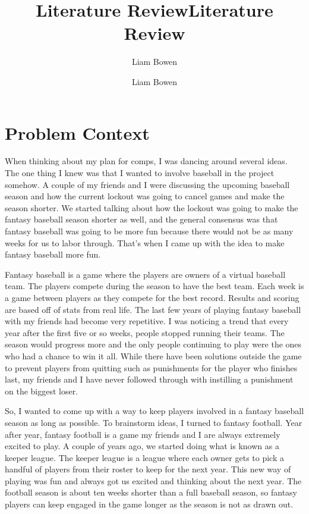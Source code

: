 \documentclass[10pt,twocolumn]{article}
\title{Literature Review}
\author{Liam Bowen}
\begin{document}
\title{Literature Review}
\author{Liam Bowen}

\maketitle

\section{Problem Context}
	
When thinking about my plan for comps, I was dancing around several ideas. The one thing I knew was that I wanted to involve baseball in the project somehow. A couple of my friends and I were discussing the upcoming baseball season and how the current lockout was going to cancel games and make the season shorter. We started talking about how the lockout was going to make the fantasy baseball season shorter as well, and the general consensus was that fantasy baseball was going to be more fun because there would not be as many weeks for us to labor through. That’s when I came up with the idea to make fantasy baseball more fun. 	
		
Fantasy baseball is a game where the players are owners of a virtual baseball team. The players compete during the season to have the best team. Each week is a game between players as they compete for the best record. Results and scoring are based off of stats from real life. The last few years of playing fantasy baseball with my friends had become very repetitive. I was noticing a trend that every year after the first five or so weeks, people stopped running their teams. The season would progress more and the only people continuing to play were the ones who had a chance to win it all. While there have been solutions outside the game to prevent players from quitting such as punishments for the player who finishes last, my friends and I have never followed through with instilling a punishment on the biggest loser. 

So, I wanted to come up with a way to keep players involved in a fantasy baseball season as long as possible. To brainstorm ideas, I turned to fantasy football. Year after year, fantasy football is a game my friends and I are always extremely excited to play. A couple of years ago, we started doing what is known as a keeper league. The keeper league is a league where each owner gets to pick a handful of players from their roster to keep for the next year. This new way of playing was fun and always got us excited and thinking about the next year. The football season is about ten weeks shorter than a full baseball season, so fantasy players can keep engaged in the game longer as the season is not as drawn out. 
\end{document}
